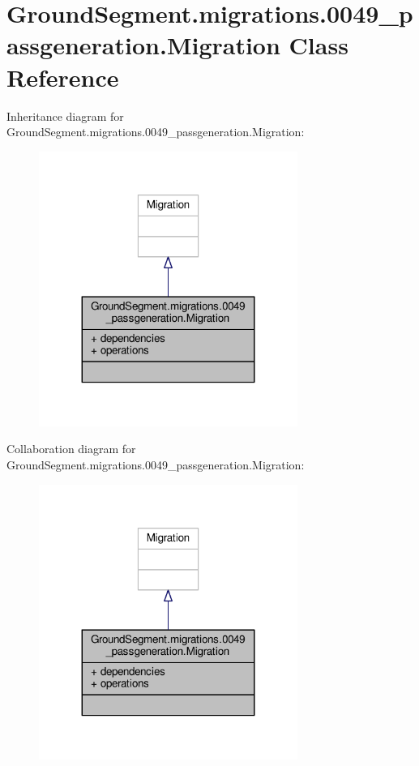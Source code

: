 \hypertarget{class_ground_segment_1_1migrations_1_10049__passgeneration_1_1_migration}{}\section{Ground\+Segment.\+migrations.0049\+\_\+passgeneration.Migration Class Reference}
\label{class_ground_segment_1_1migrations_1_10049__passgeneration_1_1_migration}


Inheritance diagram for Ground\+Segment.\+migrations.0049\+\_\+passgeneration.Migration\+:\nopagebreak
\begin{figure}[H]
\begin{center}
\leavevmode
\includegraphics[width=239pt]{class_ground_segment_1_1migrations_1_10049__passgeneration_1_1_migration__inherit__graph}
\end{center}
\end{figure}


Collaboration diagram for Ground\+Segment.\+migrations.0049\+\_\+passgeneration.Migration\+:\nopagebreak
\begin{figure}[H]
\begin{center}
\leavevmode
\includegraphics[width=239pt]{class_ground_segment_1_1migrations_1_10049__passgeneration_1_1_migration__coll__graph}
\end{center}
\end{figure}
